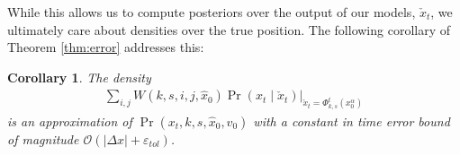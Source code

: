 \documentclass[letterpaper,10pt,conference]{ieeetran}
\newtheorem{cor}{Corollary}
\begin{document}
While this allows us to compute posteriors over the output of our models, $\check{x}_t$, we ultimately care about densities over the true position.
The following corollary of Theorem \ref{thm:error} addresses this:
\begin{cor} \label{cor:error}
	The density
	\begin{align}
		\sum_{i,j} W(k,s,i,j,\hat{x}_0) \left. \Pr( x_t \mid \check{x}_t ) \right|_{ \check{x}_t = \Phi_{k,s}^t( x_0^\alpha) } \label{eq:approximation 2}
	\end{align}
	is an approximation of $\Pr( x_t, k, s, \hat{x}_0, \hat{v}_0)$ with a constant in time error bound of magnitude $\mathcal{O}( |\Delta x| + \varepsilon_{tol} )$.
\end{cor}
\end{document}
